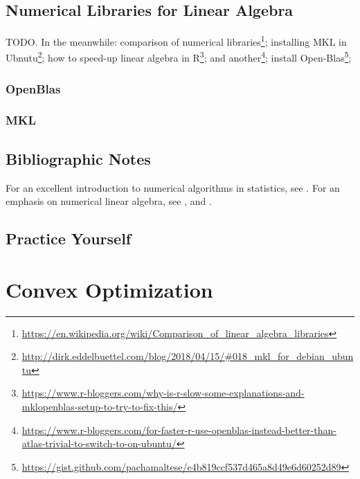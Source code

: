 \documentclass[]{book}
\renewcommand{\href}[2]{#2\footnote{\url{#1}}}
\theoremstyle{definition}
\theoremstyle{definition}
\theoremstyle{definition}
\theoremstyle{remark}
\begin{document}
\hypertarget{numerical-libraries-for-linear-algebra}{%
\section{Numerical Libraries for Linear Algebra}\label{numerical-libraries-for-linear-algebra}}

TODO.
In the meanwhile:
\href{https://en.wikipedia.org/wiki/Comparison_of_linear_algebra_libraries}{comparison of numerical libraries};
\href{http://dirk.eddelbuettel.com/blog/2018/04/15/\#018_mkl_for_debian_ubuntu}{installing MKL in Ubnutu};
\href{https://www.r-bloggers.com/why-is-r-slow-some-explanations-and-mklopenblas-setup-to-try-to-fix-this/}{how to speed-up linear algebra in R};
\href{https://www.r-bloggers.com/for-faster-r-use-openblas-instead-better-than-atlas-trivial-to-switch-to-on-ubuntu/}{and another};
\href{https://gist.github.com/pachamaltese/e4b819ccf537d465a8d49e6d60252d89}{install Open-Blas};

\hypertarget{openblas}{%
\subsection{OpenBlas}\label{openblas}}

\hypertarget{mkl}{%
\subsection{MKL}\label{mkl}}

\hypertarget{bibliographic-notes-15}{%
\section{Bibliographic Notes}\label{bibliographic-notes-15}}

For an excellent introduction to numerical algorithms in statistics, see \citet{weihs2013foundations}.
For an emphasis on numerical linear algebra, see \citet{gentle2012numerical}, and \citet{golub2012matrix}.

\hypertarget{practice-yourself-13}{%
\section{Practice Yourself}\label{practice-yourself-13}}

\hypertarget{convex}{%
\chapter{Convex Optimization}\label{convex}}
\end{document}
